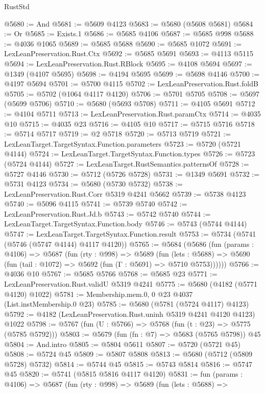 \begin{lexlean}{RustStd}
\begin{coremodule}
@5680 := And
@5681 := @5609 @4123
@5683 := @5680 (@5608 @5681)
@5684 := Or
@5685 := Exists.{1}
@5686 := @5685 @4106
@5687 := @5685 @998
@5688 := @4036 @1065
@5689 := @5685 @5688
@5690 := @5685 @1072
@5691 := LexLeanPreservation.Rust.Ctx
@5692 := @5685 @5691
@5693 := @4113 @5115
@5694 := LexLeanPreservation.Rust.RBlock
@5695 := @4108 @5694
@5697 := @1349 (@4107 @5695)
@5698 := @4194 @5695
@5699 := @5698 @4146
@5700 := @4197 @5694
@5701 := @5700 @4115
@5702 := LexLeanPreservation.Rust.foldB
@5705 := @5702 (@1064 @4117 @4120)
@5706 := @5701 @5705
@5708 := @5697 (@5699 @5706)
@5710 := @5680 (@5693 @5708)
@5711 := @4105 @5691
@5712 := @4104 @5711
@5713 := LexLeanPreservation.Rust.paramCtx
@5714 := @4035 @10
@5715 := @4035 @23
@5716 := @4105 @10
@5717 := @5715 @5716
@5718 := @5714 @5717
@5719 := @2 @5718
@5720 := @5713 @5719
@5721 := LexLeanTarget.TargetSyntax.Function.parameters
@5723 := @5720 (@5721 @4144)
@5724 := LexLeanTarget.TargetSyntax.Function.types
@5726 := @5723 (@5724 @4144)
@5727 := LexLeanTarget.RustSemantics.patternsOf
@5728 := @5727 @4146
@5730 := @5712 (@5726 @5728)
@5731 := @1349 @5691
@5732 := @5731 @4123
@5734 := @5680 (@5730 @5732)
@5738 := LexLeanPreservation.Rust.Corr @5319 @4241 @5662
@5739 := @5738 @4123
@5740 := @5096 @4115
@5741 := @5739 @5740
@5742 := LexLeanPreservation.Rust.Jd.b
@5743 := @5742 @5740
@5744 := LexLeanTarget.TargetSyntax.Function.body
@5746 := @5743 (@5744 @4144)
@5747 := LexLeanTarget.TargetSyntax.Function.result
@5753 := @5734 (@5741 (@5746 (@5747 @4144) @4117 @4120))
@5765 := @5684
    (@5686
      (fun (params : @4106) =>
      @5687
        (fun (rty : @998) =>
        @5689
          (fun (lets : @5688) =>
          @5690 (fun (tail : @1072) => @5692 (fun (Γ : @5691) => @5710 @5753))))))
@5766 := @4036 @10
@5767 := @5685 @5766
@5768 := @5685 @23
@5771 := LexLeanPreservation.Rust.validU @5319 @4241
@5775 := @5680 (@4182 (@5771 @4120) @1022)
@5781 := Membership.mem.{0, 0} @23 @4037 (List.instMembership.{0} @23)
@5785 := @5680 (@5781 (@5724 @4117) @4123)
@5792 := @4182 (LexLeanPreservation.Rust.uninh @5319 @4241 @4120 @4123) @1022
@5798 := @5767 (fun (U : @5766) => @5768 (fun (t : @23) => @5775 (@5785 @5792)))
@5803 := @5679 (fun (fn : @7) => @5683 (@5765 @5798)) @45
@5804 := And.intro
@5805 := @5804 @5611
@5807 := @5720 (@5721 @45)
@5808 := @5724 @45
@5809 := @5807 @5808
@5813 := @5680 (@5712 (@5809 @5728) @5732)
@5814 := @5744 @45
@5815 := @5743 @5814
@5816 := @5747 @45
@5820 := @5741 (@5815 @5816 @4117 @4120)
@5831 := fun (params : @4106) =>
  @5687
    (fun (rty : @998) =>
    @5689
      (fun (lets : @5688) =>

\end{coremodule}
\end{lexlean}
